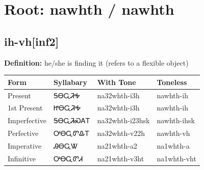\documentclass{article}%
\begin{document}
%
\normalsize%
\section*{Root: nawhth / nawhth}%
\subsection*{ih-vh[inf2]}%
\textbf{Definition: }%
he/she is finding it (refers to a flexible object)%
\\[0.5em]%
\begin{tabular}{|l|l|l|l|}%
\hline%
\textbf{Form}&\textbf{Syllabary}&\textbf{With Tone}&\textbf{Toneless}\\%
\hline%
Present&ᎦᎾᏩᏘᎭ&na32whth{-}i3h&nawhth{-}ih\\%
1st Present&ᏥᎾᏩᏘᎭ&na32whth{-}i3h&nawhth{-}ih\\%
Imperfective&ᎦᎾᏩᏘᏍᎪᎢ&na32whth{-}i23hsk&nawhth{-}ihsk\\%
Perfective&ᎤᎾᏩᏛᎲᎢ&na32whth{-}v22h&nawhth{-}vh\\%
Imperative&ᎯᎾᏩᏔ&na21whth{-}a2&na1whth{-}a\\%
Infinitive&ᎤᎾᏩᏛᏗ&na21whth{-}v3ht&na1whth{-}vht\\%
\hline%
\end{tabular}%
\\[1em]%
\end{document}
